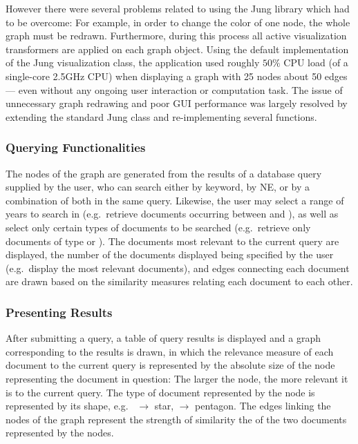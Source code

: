 
However there were several problems related to using the Jung library which had to be overcome: For example, in order to change the color of
one node, the whole graph must be redrawn. Furthermore, during this process all active visualization
transformers are applied on each graph object. Using the default implementation of the
Jung visualization class, the application used roughly $50\%$ CPU load (of a single-core 2.5GHz CPU) when displaying a graph with 25 nodes about 50 edges--- even without any ongoing user interaction or computation task. The issue of
unnecessary graph redrawing and poor GUI performance was largely resolved by extending
the standard Jung  class and re-implementing several functions. 

\subsubsection {Querying Functionalities}
\label{sec:querying_functionalities}
The nodes of the graph are generated from the results of a database query supplied by the user, who
can search either by keyword, by NE, or by a combination of both in the same query. Likewise, the
user may select a range of years to search in (e.g.\ retrieve documents occurring between
 and ), as well as select only certain types of documents to be searched
(e.g.\ retrieve only documents of type  or ). The documents most
relevant to the current query are displayed, the number of the documents displayed being specified
by the user (e.g.\ display the  most relevant documents), and edges connecting each
document are drawn based on the similarity measures relating each document to each other.

\subsubsection {Presenting Results}
\label{sec:presenting_results}
After submitting a query, a table of query results is displayed and a graph corresponding to the
results is drawn, in which the relevance measure of each document to the current query is
represented by the absolute size of the node representing the document in question: The larger the
node, the more relevant it is to the current query. The type of document represented by the node is
represented by its shape, e.g.\  $\rightarrow$ star,  $\rightarrow$
pentagon. The edges linking the nodes of the graph represent the strength of similarity the of the
two documents represented by the nodes.